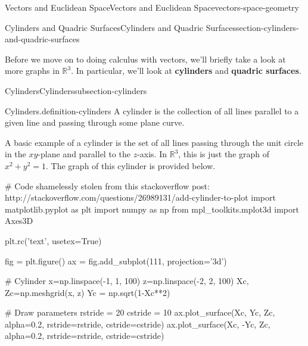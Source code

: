 \documentclass[oneside,10pt,]{book}
\newcommand{\terminology}[1]{\textbf{#1}}
\numberwithin{equation}{section}
\newcommand{\RR}{\mathbb{R}}
\begin{document}
\begin{chapterptx}{Vectors and Euclidean Space}{}{Vectors and Euclidean Space}{}{}{vectors-space-geometry}
\typeout{************************************************}
%
\begin{sectionptx}{Cylinders and Quadric Surfaces}{}{Cylinders and Quadric Surfaces}{}{}{section-cylinders-and-quadric-surfaces}
\begin{introduction}{}%
\hypertarget{p-1234}{}%
Before we move on to doing calculus with vectors, we'll briefly take a look at more graphs in \(\RR^{3}\). In particular, we'll look at \terminology{cylinders} and \terminology{quadric surfaces}.%
\end{introduction}%
%
%
\typeout{************************************************}
\typeout{************************************************}
%
\begin{subsectionptx}{Cylinders}{}{Cylinders}{}{}{subsection-cylinders}
\begin{definition}{Cylinders.}{definition-cylinders}%
\hypertarget{p-1235}{}%
A cylinder is the collection of all lines parallel to a given line and passing through some plane curve.%
\end{definition}
\hypertarget{p-1236}{}%
A basic example of a cylinder is the set of all lines passing through the unit circle in the \(xy\)-plane and parallel to the \(z\)-axis. In \(\RR^{3}\), this is just the graph of \(x^{2}+y^{2}=1\). The graph of this cylinder is provided below.%
\begin{sageinput}
# Code shamelessly stolen from this stackoverflow post: http://stackoverflow.com/questions/26989131/add-cylinder-to-plot
import matplotlib.pyplot as plt
import numpy as np
from mpl_toolkits.mplot3d import Axes3D

plt.rc('text', usetex=True)

fig = plt.figure()
ax = fig.add_subplot(111, projection='3d')

# Cylinder
x=np.linspace(-1, 1, 100)
z=np.linspace(-2, 2, 100)
Xc, Zc=np.meshgrid(x, z)
Yc = np.sqrt(1-Xc**2)

# Draw parameters
rstride = 20
cstride = 10
ax.plot_surface(Xc, Yc, Zc, alpha=0.2, rstride=rstride, cstride=cstride)
ax.plot_surface(Xc, -Yc, Zc, alpha=0.2, rstride=rstride, cstride=cstride)


\end{sageinput}
\end{subsectionptx}
\end{sectionptx}
\end{chapterptx}
\end{document}
